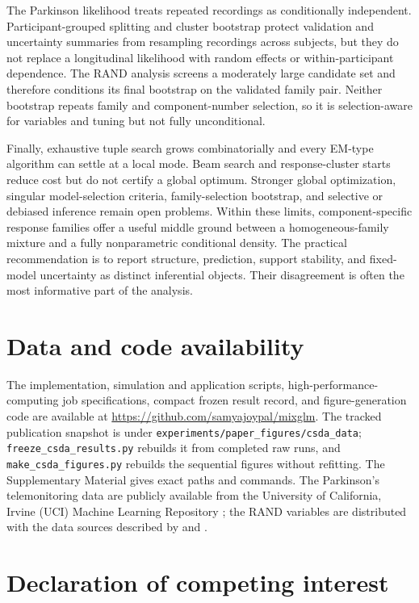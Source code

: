 \documentclass[a4paper,fleqn]{cas-sc}
\begin{document}
The Parkinson likelihood treats repeated recordings as conditionally independent. Participant-grouped splitting and cluster bootstrap protect validation and uncertainty summaries from resampling recordings across subjects, but they do not replace a longitudinal likelihood with random effects or within-participant dependence. The RAND analysis screens a moderately large candidate set and therefore conditions its final bootstrap on the validated family pair. Neither bootstrap repeats family and component-number selection, so it is selection-aware for variables and tuning but not fully unconditional.

Finally, exhaustive tuple search grows combinatorially and every EM-type algorithm can settle at a local mode. Beam search and response-cluster starts reduce cost but do not certify a global optimum. Stronger global optimization, singular model-selection criteria, family-selection bootstrap, and selective or debiased inference remain open problems. Within these limits, component-specific response families offer a useful middle ground between a homogeneous-family mixture and a fully nonparametric conditional density. The practical recommendation is to report structure, prediction, support stability, and fixed-model uncertainty as distinct inferential objects. Their disagreement is often the most informative part of the analysis.

\section*{Data and code availability}

The implementation, simulation and application scripts, high-performance-computing job specifications, compact frozen result record, and figure-generation code are available at \url{https://github.com/samyajoypal/mixglm}. The tracked publication snapshot is under \texttt{experiments/paper\_figures/csda\_data}; \texttt{freeze\_csda\_results.py} rebuilds it from completed raw runs, and \texttt{make\_csda\_figures.py} rebuilds the sequential figures without refitting. The Supplementary Material gives exact paths and commands. The Parkinson's telemonitoring data are publicly available from the University of California, Irvine (UCI) Machine Learning Repository \citep{uci2009parkinsons}; the RAND variables are distributed with the data sources described by \citet{deb2002health} and \citet{cameron2005microeconometrics}.

\section*{Declaration of competing interest}
\end{document}
